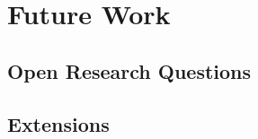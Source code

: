 \section{Future Work}
\label{sec:future_work}

\subsection{Open Research Questions}

\subsection{Extensions}

\clearpage